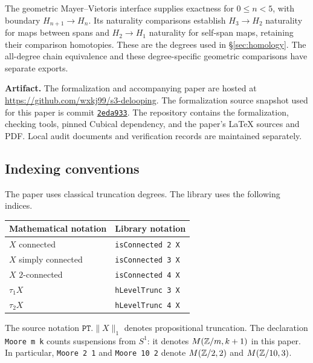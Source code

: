 The geometric Mayer--Vietoris interface supplies exactness for $0\leq n<5$,
with boundary $H_{n+1}\to H_n$. Its naturality comparisons establish
$H_3\to H_2$ naturality for maps between spans and $H_2\to H_1$ naturality
for self-span maps, retaining their comparison homotopies. These are the
degrees used in \S\ref{sec:homology}. The all-degree chain equivalence
and these degree-specific geometric comparisons have separate exports.

\medskip
\noindent\textbf{Artifact.} The formalization and accompanying paper are hosted at \url{https://github.com/wxkj99/s3-delooping}. The formalization source snapshot used for this paper is commit \href{https://github.com/wxkj99/s3-delooping/tree/2eda93321fa89daa4875e6921db3b5fae19f75f2}{\texttt{2eda933}}. The repository contains the formalization, checking tools, pinned Cubical dependency, and the paper's \LaTeX{} sources and PDF. Local audit documents and verification records are maintained separately.

\subsection{Indexing conventions}
The paper uses classical truncation degrees. The library uses the following
indices.
\begin{center}
\small
\begin{tabular}{@{}ll@{}}
\toprule
Mathematical notation & Library notation \\
\midrule
$X$ connected & \texttt{isConnected 2 X} \\
$X$ simply connected & \texttt{isConnected 3 X} \\
$X$ $2$-connected & \texttt{isConnected 4 X} \\
$\tau_1X$ & \texttt{hLevelTrunc 3 X} \\
$\tau_2X$ & \texttt{hLevelTrunc 4 X} \\
\bottomrule
\end{tabular}
\end{center}
The source notation $\texttt{PT.}\lVert X\rVert_1$ denotes propositional
truncation. The declaration \texttt{Moore m k} counts suspensions from
$S^1$: it denotes $M(\mathbb Z/m,k+1)$ in this paper. In particular,
\texttt{Moore 2 1} and \texttt{Moore 10 2} denote $M(\mathbb Z/2,2)$ and
$M(\mathbb Z/10,3)$.

